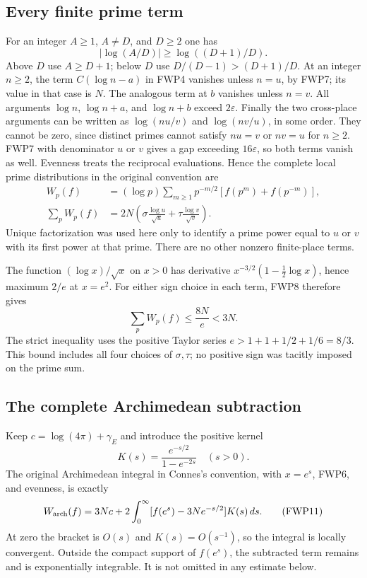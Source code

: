 \documentclass[11pt]{article}
\begin{document}
\subsection{Every finite prime term}

For an integer $A\ge1$, $A\ne D$, and $D\ge2$ one has
\[
 |\log(A/D)|\ge\log((D+1)/D).
 \tag{FWP7}
\]
Above $D$ use $A\ge D+1$; below $D$ use
$D/(D-1)>(D+1)/D$. At an integer $n\ge2$, the term
$C(\log n-a)$ in FWP4 vanishes unless $n=u$, by FWP7;
its value in that case is $N$. The analogous term at $b$ vanishes
unless $n=v$. All arguments $\log n$, $\log n+a$, and $\log n+b$
exceed $2\varepsilon$. Finally the two cross-place arguments can
be written as $\log(nu/v)$ and $\log(nv/u)$, in some order.
They cannot be zero, since distinct primes cannot satisfy $nu=v$
or $nv=u$ for $n\ge2$. FWP7 with denominator $u$ or $v$ gives
a gap exceeding $16\varepsilon$, so both terms vanish as well.
Evenness treats the reciprocal evaluations. Hence the complete
local prime distributions in the original convention are
\[
\begin{split}
 W_p(f)&=(\log p)\sum_{m\ge1}p^{-m/2}
                           [f(p^m)+f(p^{-m})],\\
 \sum_pW_p(f)&=2N\left(\sigma\frac{\log u}{\sqrt u}
                            +\tau\frac{\log v}{\sqrt v}\right).
\end{split}
\tag{FWP8}
\]
Unique factorization was used here only to identify a prime power
equal to $u$ or $v$ with its first power at that prime. There are no
other nonzero finite-place terms.

The function $(\log x)/\sqrt x$ on $x>0$ has derivative
$x^{-3/2}(1-\tfrac12\log x)$, hence maximum $2/e$ at $x=e^2$.
For either sign choice in each term, FWP8 therefore gives
\[
 \sum_p W_p(f)\le\frac{8N}{e}<3N.
 \tag{FWP9}
\]
The strict inequality uses the positive Taylor series
$e>1+1+1/2+1/6=8/3$. This bound includes all four choices of
$\sigma,\tau$; no positive sign was tacitly imposed on the prime sum.

\subsection{The complete Archimedean subtraction}

Keep $c=\log(4\pi)+\gamma_E$ and introduce the positive kernel
\[
 K(s)=\frac{e^{-s/2}}{1-e^{-2s}}\quad(s>0).
 \tag{FWP10}
\]
The original Archimedean integral in Connes's convention, with
$x=e^s$, FWP6, and evenness, is exactly
\[
 W_{\rm arch}(f)=3Nc+
     2\int_0^\infty[f(e^s)-3Ne^{-s/2}]K(s)\,ds.
 \tag{FWP11}
\]
At zero the bracket is $O(s)$ and $K(s)=O(s^{-1})$, so the integral
is locally convergent. Outside the compact support of $f(e^s)$,
the subtracted term remains and is exponentially integrable. It is
not omitted in any estimate below.
\end{document}
